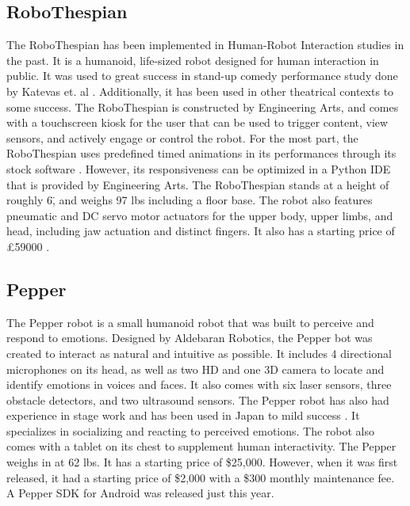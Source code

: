 \documentclass[onecolumn, draftclsnofoot,10pt, compsoc]{IEEEtran}
\begin{document}
\subsection{RoboThespian}
The RoboThespian has been implemented in Human-Robot Interaction studies in the past.
It is a humanoid, life-sized robot designed for human interaction in public.
It was used to great success in stand-up comedy performance study done by Katevas et. al \cite{KatevasRobot:2014}.
Additionally, it has been used in other theatrical contexts \cite{Spillikin} to some success.
The RoboThespian is constructed by Engineering Arts, and comes with a touchscreen kiosk for the user that can be used to trigger content, view sensors, and actively engage or control the robot.
For the most part, the RoboThespian uses predefined timed animations in its performances through its stock software \cite{KatevasRobot:2014}.
However, its responsiveness can be optimized in a Python IDE that is provided by Engineering Arts.
The RoboThespian stands at a height of roughly 6\", and weighs 97 lbs including a floor base.
The robot also features pneumatic and DC servo motor actuators for the upper body, upper limbs, and head, including jaw actuation and distinct fingers.
It also has a starting price of \pounds59000 \cite{EngineeredArts}.


\subsection{Pepper}
The Pepper robot is a small humanoid robot that was built to perceive and respond to emotions.
Designed by Aldebaran Robotics, the Pepper bot was created to interact as natural and intuitive as possible.
It includes 4 directional microphones on its head, as well as two HD and one 3D camera to locate and identify emotions in voices and faces.
It also comes with six laser sensors, three obstacle detectors, and two ultrasound sensors.
The Pepper robot has also had experience in stage work and has been used in Japan to mild success \cite{PepperVid}.
It specializes in socializing and reacting to perceived emotions.
The robot also comes with a tablet on its chest to supplement human interactivity.
The Pepper weighs in at 62 lbs.
It has a starting price of \$25,000. However, when it was first released, it had a starting price of \$2,000 with a \$300 monthly maintenance fee.
A Pepper SDK for Android was released just this year. \cite{PepperBot}
\end{document}
